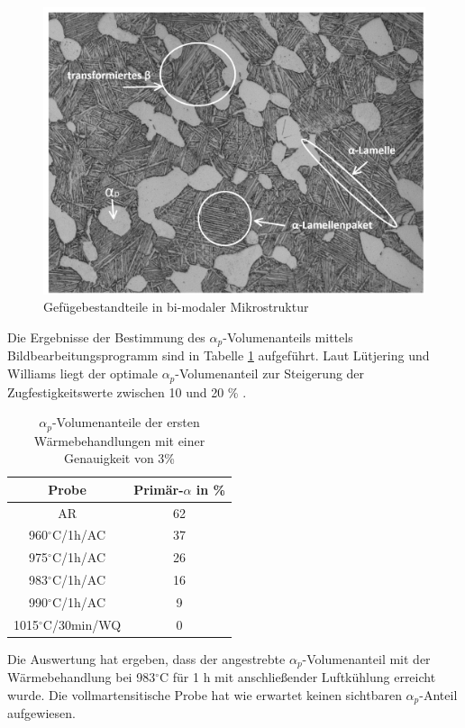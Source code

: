 \begin{figure}
	\centering
	\includegraphics[width=0.8\linewidth]{./Bilder/Abbildung 20.png}
	\caption[Abbildung 20]{Gefügebestandteile in bi-modaler Mikrostruktur}
	\label{fig:abbildung-20}
\end{figure}

Die Ergebnisse der Bestimmung des $\alpha_p$-Volumenanteils mittels Bildbearbeitungsprogramm sind in Tabelle \ref{Tabelle 4} aufgeführt. Laut Lütjering und Williams liegt der optimale $\alpha_p$-Volumenanteil zur Steigerung der Zugfestigkeitswerte zwischen 10 und 20 \% \cite{Lutjering.2007}.

\begin{table}
	\centering
	\begin{tabular}{|c|c|}
		\hline 
		Probe & Primär-$\alpha$ in \% \\ 
		\hline 
		AR & 62 \\ 
		\hline 
		960$^\circ$C/1h/AC & 37 \\ 
		\hline 
		975$^\circ$C/1h/AC & 26 \\ 
		\hline 
		983$^\circ$C/1h/AC & 16 \\ 
		\hline 
		990$^\circ$C/1h/AC & 9 \\ 
		\hline 
		1015$^\circ$C/30min/WQ & 0 \\ 
		\hline 
	\end{tabular} 
	\caption{$\alpha_p$-Volumenanteile der ersten Wärmebehandlungen mit einer Genauigkeit von 3\%}
	\label{Tabelle 4}
\end{table}

Die Auswertung hat ergeben, dass der angestrebte $\alpha_p$-Volumenanteil mit der Wärmebehandlung bei 983$^\circ$C für 1 h mit anschließender Luftkühlung erreicht wurde. Die vollmartensitische Probe hat wie erwartet keinen sichtbaren $\alpha_p$-Anteil aufgewiesen.

